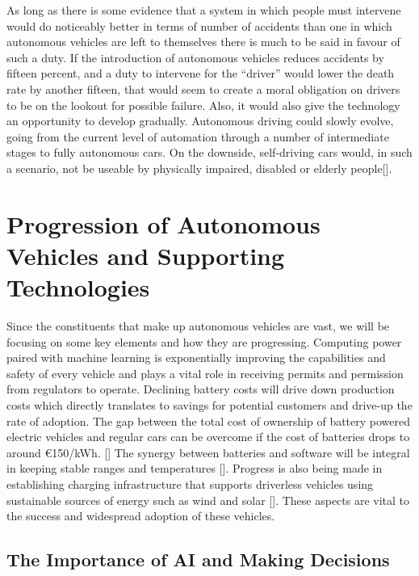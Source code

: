 \documentclass{article}
\begin{document}
As long as there is some evidence that a system in which people must intervene would do noticeably better in terms of number of accidents than one in which autonomous vehicles are left to themselves there is much to be said in favour of such a duty. If the introduction of autonomous vehicles reduces accidents by fifteen percent, and a duty to intervene for the “driver” would lower the death rate by another fifteen, that would seem to create a moral obligation on drivers to be on the lookout for possible failure. Also, it would also give the technology an opportunity to develop gradually. Autonomous driving could slowly evolve, going from the current level of automation through a number of intermediate stages to fully autonomous cars. On the downside, self-driving cars would, in such a scenario, not be useable by physically impaired, disabled or elderly people[\textcite{hevelke2015responsibility}].


\section{Progression of Autonomous Vehicles and Supporting Technologies}

Since the constituents that make up autonomous vehicles are vast, we will be focusing on some key elements and how they are progressing. Computing power paired with machine learning is exponentially improving the capabilities and safety of every vehicle and plays a vital role in receiving permits and permission from regulators to operate. Declining battery costs will drive down production costs which directly translates to savings for potential customers and drive-up the rate of adoption. The gap between the total cost of ownership of battery powered electric vehicles and regular cars can be overcome if the cost of batteries drops to around
€150/kWh. [\textcite{van2011energy}] The synergy between batteries and software will be integral in keeping stable ranges and temperatures [\textcite{ali2019towards}]. Progress is also being made in establishing charging infrastructure that supports driverless vehicles using sustainable sources of energy such as wind and solar [\textcite{nunes2015day}]. These aspects are vital to the success and widespread adoption of these vehicles.  

\subsection{The Importance of AI and Making Decisions}
\end{document}
